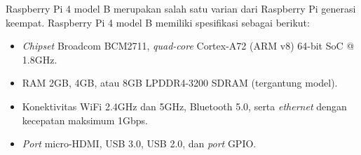 Raspberry Pi 4 model B merupakan salah satu varian dari Raspberry Pi generasi keempat.
Raspberry Pi 4 model B memiliki spesifikasi sebagai berikut:
\begin{itemize}
  \item \textit{Chipset} Broadcom BCM2711, \textit{quad-core} Cortex-A72 (ARM v8) 64-bit SoC @ 1.8GHz.
  \item RAM 2GB, 4GB, atau 8GB LPDDR4-3200 SDRAM (tergantung model).
  \item Konektivitas WiFi 2.4GHz dan 5GHz, Bluetooth 5.0, serta \textit{ethernet} dengan kecepatan maksimum 1Gbps.
  \item \textit{Port} micro-HDMI, USB 3.0, USB 2.0, dan \textit{port} GPIO.
\end{itemize}
%

